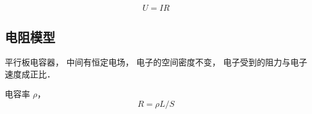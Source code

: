 

\begin{equation}
U = IR
\end{equation}


\subsection{电阻模型}
平行板电容器， 中间有恒定电场， 电子的空间密度不变， 电子受到的阻力与电子速度成正比．

电容率 $\rho$， 
\begin{equation}
R = \rho L / S
\end{equation}
